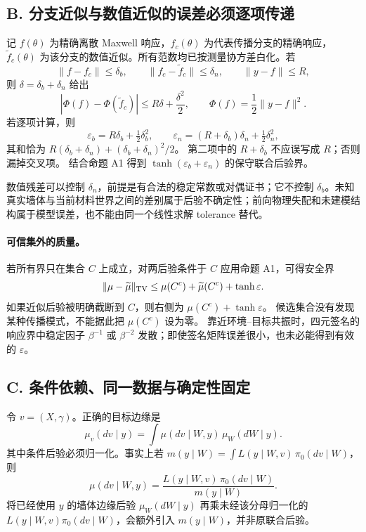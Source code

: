 \subsection*{B. 分支近似与数值近似的误差必须逐项传递}

记 $f(\theta)$ 为精确离散 Maxwell 响应，$f_c(\theta)$ 为代表传播分支的精确响应，$\widetilde f_c(\theta)$ 为该分支的数值近似。所有范数均已按测量协方差白化。若
\[
 \lVert f-f_c\rVert\le\delta_b,
 \qquad\lVert f_c-\widetilde f_c\rVert\le\delta_n,
 \qquad\lVert y-f\rVert\le R,
\]
则 $\delta=\delta_b+\delta_n$ 给出
\[
 |\Phi(f)-\Phi(\widetilde f_c)|
 \le R\delta+\frac{\delta^2}{2},
 \qquad\Phi(f)=\frac12\lVert y-f\rVert^2.
\]
若逐项计算，则
\[
 \varepsilon_b=R\delta_b+\tfrac12\delta_b^2,
 \qquad
 \varepsilon_n=(R+\delta_b)\delta_n+\tfrac12\delta_n^2,
\]
其和恰为 $R(\delta_b+\delta_n)+(\delta_b+\delta_n)^2/2$。
第二项中的 $R+\delta_b$ 不应误写成 $R$；否则漏掉交叉项。
结合命题 A1 得到 $\tanh(\varepsilon_b+\varepsilon_n)$ 的保守联合后验界。

数值残差可以控制 $\delta_n$，前提是有合法的稳定常数或对偶证书；它不控制 $\delta_b$。未知真实墙体与当前材料世界之间的差别属于后验不确定性；前向物理失配和未建模结构属于模型误差，也不能由同一个线性求解 tolerance 替代。

\paragraph{可信集外的质量。}
若所有界只在集合 $C$ 上成立，对两后验条件于 $C$ 应用命题 A1，可得安全界
\[
 \lVert\mu-\widetilde\mu\rVert_{\rm TV}
 \le\mu(C^c)+\widetilde\mu(C^c)+\tanh\varepsilon.
\]
如果近似后验被明确截断到 $C$，则右侧为 $\mu(C^c)+\tanh\varepsilon$。
候选集合没有发现某种传播模式，不能据此把 $\mu(C^c)$ 设为零。
靠近环境--目标共振时，四元签名的响应界中稳定因子 $\beta^{-1}$ 或 $\beta^{-2}$ 发散；即使签名矩阵误差很小，也未必能得到有效的 $\varepsilon$。

\subsection*{C. 条件依赖、同一数据与确定性固定}

令 $v=(X,\gamma)$。正确的目标边缘是
\[
 \mu_v(dv\mid y)=\int\mu(dv\mid W,y)\,\mu_W(dW\mid y).
\]
其中条件后验必须归一化。事实上若
$m(y\mid W)=\int L(y\mid W,v)\,\pi_0(dv\mid W)$，则
\[
 \mu(dv\mid W,y)=
 \frac{L(y\mid W,v)\,\pi_0(dv\mid W)}{m(y\mid W)}.
\]
将已经使用 $y$ 的墙体边缘后验 $\mu_W(dW\mid y)$ 再乘未经该分母归一化的 $L(y\mid W,v)\pi_0(dv\mid W)$，会额外引入 $m(y\mid W)$，并非原联合后验。

